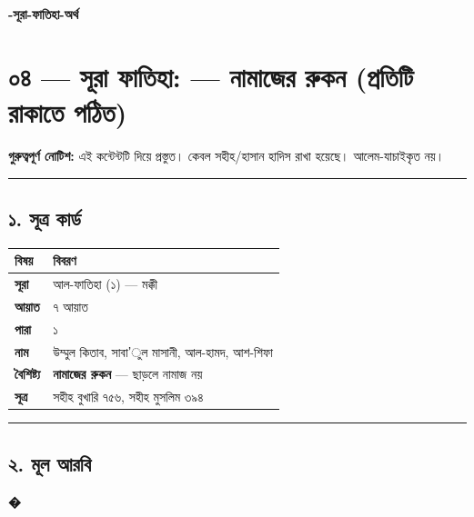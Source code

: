 

\begin{center}{\Large\bfseries\color{emerald} -সূরা-ফাতিহা-অর্থ}\end{center}
\vspace{1em}
\section*{০৪ — সূরা ফাতিহা: \textit{} — নামাজের রুকন (প্রতিটি রাকাতে পঠিত)}

\begin{warnbox}
 \textbf{গুরুত্বপূর্ণ নোটিশ:} এই কন্টেন্টটি  দিয়ে প্রস্তুত। কেবল সহীহ/হাসান হাদিস রাখা হয়েছে। আলেম-যাচাইকৃত নয়।
\end{warnbox}

\medskip\hrule\medskip

\subsection*{১. সূত্র কার্ড}

\begin{table}[h]\centering\small
\begin{tabular}{ll}
বিষয় & বিবরণ \\
\hline
\textbf{সূরা} & আল-ফাতিহা (১) — মক্কী \\
\textbf{আয়াত} & ৭ আয়াত \\
\textbf{পারা} & ১ \\
\textbf{নাম} & উম্মুল কিতাব, সাবা'ুল মাসানী, আল-হামদ, আশ-শিফা \\
\textbf{বৈশিষ্ট্য} & \textbf{নামাজের রুকন} — ছাড়লে নামাজ নয় \\
\textbf{সূত্র} & সহীহ বুখারি ৭৫৬, সহীহ মুসলিম ৩৯৪ \\
\hline
\end{tabular}
\end{table}

\medskip\hrule\medskip

\subsection*{২. মূল আরবি}

\begin{center}\end{center}
\begin{center}\end{center}
\begin{center}\end{center}
\begin{center}\end{center}
\textbf{   �}
\begin{center}\end{center}
\begin{center}\end{center}

